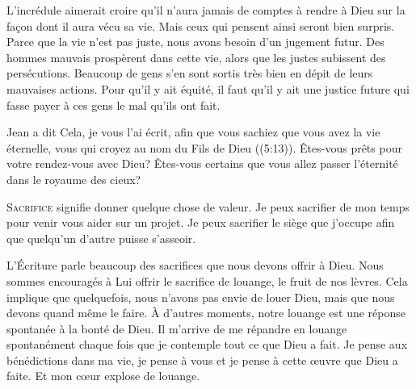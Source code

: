 
L'incrédule aimerait croire qu'il n'aura jamais de comptes à rendre à Dieu
 sur la fa\c{c}on dont il aura vécu sa vie. Mais ceux qui pensent ainsi
 seront bien surpris. Parce que la vie n'est pas juste, nous avons besoin
 d'un jugement futur. Des hommes mauvais prospèrent dans cette vie,
 alors que les justes subissent des persécutions. Beaucoup de gens
 s'en sont sortis très bien en dépit de leurs mauvaises actions.
 Pour qu'il y ait équité, il faut qu'il y ait une justice future
 qui fasse payer à ces gens le mal qu'ils ont fait. 

Jean a dit\frcolon{} 
 \Og Cela, je vous l'ai écrit, afin que vous sachiez que vous avez
 la vie éternelle, vous qui croyez au nom du Fils de Dieu \Fg{}
 ((5:13)).
 Êtes-vous prêts pour votre rendez-vous avec Dieu?
 Êtes-vous certains que vous allez passer l'éternité
 dans le royaume des cieux? 

\dvrule






\lettrine{S}{acrifice} signifie donner quelque chose de valeur.
 Je peux sacrifier de mon temps pour venir vous aider sur un projet.
 Je peux sacrifier le siège que j'occupe afin que quelqu'un d'autre
 puisse s'asseoir. 

L'Écriture parle beaucoup des sacrifices que nous devons offrir à Dieu.
 Nous sommes encouragés à Lui offrir le sacrifice de louange,
 le fruit de nos lèvres. Cela implique que quelquefois, nous n'avons pas envie
 de louer Dieu, mais que nous devons quand même le faire.
 À d'autres moments, notre louange est une réponse spontanée
 à la bonté de Dieu. Il m'arrive de me répandre en louange spontanément
 chaque fois que je contemple tout ce que Dieu a fait.
 Je pense aux bénédictions dans ma vie, je pense à vous et je pense
 à cette \oe{}uvre que Dieu a faite. Et mon c\oe{}ur explose de louange. 

